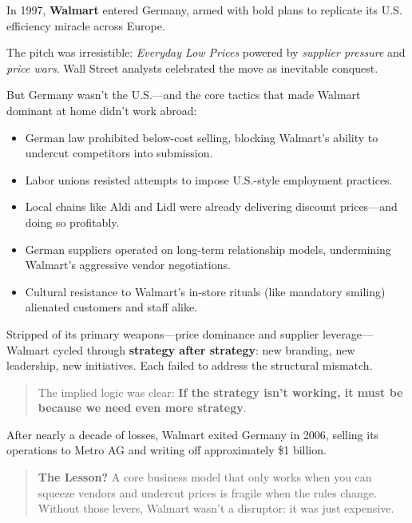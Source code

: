 \begin{tcolorbox}[colback=blue!5!white, colframe=blue!50!black, breakable,
  title={Historical Sidebar: When Strategy Eats Itself --- Walmart's German Collapse}]

In 1997, \textbf{Walmart} entered Germany, armed with bold plans to replicate its U.S. efficiency miracle across Europe.

\medskip

The pitch was irresistible: \textit{Everyday Low Prices} powered by \textit{supplier pressure} and \textit{price wars}. Wall Street analysts celebrated the move as inevitable conquest.

\medskip

But Germany wasn’t the U.S.—and the core tactics that made Walmart dominant at home didn’t work abroad:
\begin{itemize}
    \item German law prohibited below-cost selling, blocking Walmart’s ability to undercut competitors into submission.
    \item Labor unions resisted attempts to impose U.S.-style employment practices.
    \item Local chains like Aldi and Lidl were already delivering discount prices—and doing so profitably.
    \item German suppliers operated on long-term relationship models, undermining Walmart’s aggressive vendor negotiations.
    \item Cultural resistance to Walmart’s in-store rituals (like mandatory smiling) alienated customers and staff alike.
\end{itemize}

\medskip

Stripped of its primary weapons—price dominance and supplier leverage—Walmart cycled through \textbf{strategy after strategy}: new branding, new leadership, new initiatives. Each failed to address the structural mismatch.

\medskip

\begin{quote}
The implied logic was clear: \textbf{If the strategy isn’t working, it must be because we need even more strategy}.
\end{quote}

\medskip

After nearly a decade of losses, Walmart exited Germany in 2006, selling its operations to Metro AG and writing off approximately \$1 billion.

\medskip

\begin{quote}
\textbf{The Lesson?} A core business model that only works when you can squeeze vendors and undercut prices is fragile when the rules change. Without those levers, Walmart wasn’t a disruptor: it was just expensive.
\end{quote}

\end{tcolorbox}




